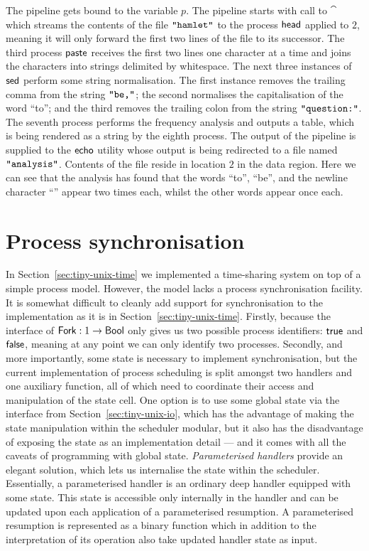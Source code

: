 \documentclass[12pt,phd,lfcs,twoside,openright,logo,leftchapter,normalheadings]{infthesis}
\theoremstyle{plain}
\theoremstyle{definition}
\begin{document}
%
The pipeline gets bound to the variable $p$. The pipeline starts with
call to $\cat$ which streams the contents of the file
$\texttt{"hamlet"}$ to the process $\mathsf{head}$ applied to $2$, meaning it
will only forward the first two lines of the file to its
successor. The third process $\mathsf{paste}$ receives the first two lines one
character at a time and joins the characters into strings delimited by
whitespace. The next three instances of $\mathsf{sed}$ perform some string
normalisation. The first instance removes the trailing comma from the
string $\texttt{"be,"}$; the second normalises the capitalisation of the
word ``to''; and the third removes the trailing colon from the string
$\texttt{"question:"}$. The seventh process performs the frequency
analysis and outputs a table, which is being rendered as a string by
the eighth process. The output of the pipeline is supplied to the
$\mathsf{echo}$ utility whose output is being redirected to a file named
$\texttt{"analysis"}$. Contents of the file reside in location $2$ in
the data region. Here we can see that the analysis has found that the
words ``to'', ``be'', and the newline character ``\nl{}'' appear two
times each, whilst the other words appear once each.

\section{Process synchronisation}
\label{sec:tiny-unix-proc-sync}
%
In Section~\ref{sec:tiny-unix-time} we implemented a time-sharing
system on top of a simple process model. However, the model lacks a
process synchronisation facility. It is somewhat difficult to cleanly
add support for synchronisation to the implementation as it is in
Section~\ref{sec:tiny-unix-time}. Firstly, because the interface of
$\mathsf{Fork} : 1 \to \mathsf{Bool}$ only gives us two possible process
identifiers: $\mathsf{true}$ and $\mathsf{false}$, meaning at any point we can only
identify two processes. Secondly, and more importantly, some state is
necessary to implement synchronisation, but the current implementation
of process scheduling is split amongst two handlers and one auxiliary
function, all of which need to coordinate their access and
manipulation of the state cell. One option is to use some global state
via the interface from Section~\ref{sec:tiny-unix-io}, which has the
advantage of making the state manipulation within the scheduler
modular, but it also has the disadvantage of exposing the state as an
implementation detail --- and it comes with all the caveats of
programming with global state. \emph{Parameterised handlers} provide
an elegant solution, which lets us internalise the state within the
scheduler. Essentially, a parameterised handler is an ordinary deep
handler equipped with some state. This state is accessible only
internally in the handler and can be updated upon each application of
a parameterised resumption. A parameterised resumption is represented
as a binary function which in addition to the interpretation of its
operation also take updated handler state as input.
\end{document}
